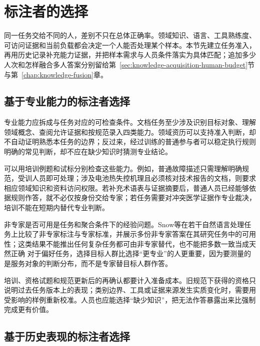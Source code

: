 \section{标注者的选择}
\label{sec:knowledge-acquisition-human-annotator-selection}

同一任务交给不同的人，差别不只在总体正确率。领域知识、语言、工具熟练度、可访问证据和当前负载都会决定一个人能否处理某个样本。本节先建立任务准入，再用历史记录补充能力证据，并把样本需求与人员条件落实为具体匹配；追加多少人次和怎样融合多人答案分别留给第~\ref{sec:knowledge-acquisition-human-budget}节与第~\ref{chap:knowledge-fusion}章。

\subsection{基于专业能力的标注者选择}
\label{sec:knowledge-acquisition-human-expertise-selection}

专业能力应拆成与任务对应的可检查条件。文档任务至少涉及识别目标对象、理解领域概念、查阅允许证据和按规范录入四类能力。领域资历可以支持准入判断，却不自动证明熟悉本任务的边界；反过来，经过训练的普通参与者可以稳定执行规则明确的常见判断，却不应在缺少知识时猜测专业结论。

可以用培训例题和试标分别检查这些能力。例如，普通故障描述只需理解明确规范，受训人员即可处理；涉及电池热失控机理且必须核对技术报告的文档，则要求相应领域知识和资料访问权限。若补充术语表与证据摘要后，普通人员已经能够依据规则作答，就不必仅按身份交给专家；若任务需要对冲突医学证据作专业裁决，培训不能在短期内替代专业判断。

非专家是否可用是任务和聚合条件下的经验问题。Snow等在若干自然语言处理任务上比较了非专家标注与专家标准，并展示多份非专家答案在其研究任务中的可用性；这类结果不能推出任何复杂任务都可由非专家替代，也不能把多数一致当成天然正确
对于偏好任务，选择目标人群比选择“更专业”的人更重要，因为要测量的是服务对象的判断分布，而不是专家替目标人群作答。

培训、资格试题和规范更新后的再确认都要计入准备成本。旧规范下获得的资格只说明过去任务版本上的表现；类别边界、工具或证据来源发生实质变化时，需要用受影响的样例重新校准。人员也应能选择“缺少知识”，把无法作答暴露出来比强制完成更有价值。

\subsection{基于历史表现的标注者选择}
\label{sec:knowledge-acquisition-human-history-selection}


